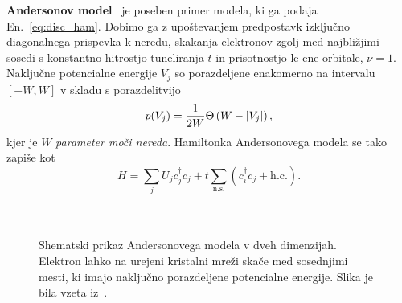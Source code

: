 \documentclass[10pt,a4paper]{article}
\begin{document}
\begin{minipage}[t]{0.54\textwidth}
\noindent
\textbf{Andersonov model}~\cite{anderson1958absence} je poseben primer modela, ki ga podaja En.~\eqref{eq:disc_ham}. Dobimo ga z upoštevanjem predpostavk izključno diagonalnega prispevka k neredu, skakanja elektronov zgolj med najbližjimi sosedi s konstantno hitrostjo tuneliranja $t$ in prisotnostjo le ene orbitale, $\nu=1$. Naključne potencialne energije $V_j$ so porazdeljene enakomerno na intervalu $\left[-W,W\right]$ v skladu s porazdelitvijo
\begin{equation}\label{eq:and_prob}
p(V_j)= \frac{1}{2W}\Theta \left(W - \left| V_j \right| \right),
\end{equation}
kjer je $W$ \emph{parameter moči nereda}. Hamiltonka Andersonovega modela se tako zapiše kot 
\begin{equation}\label{eq:Anderson_ham}
H=\sum\limits_j U_j c^\dagger_jc_j + t\sum\limits_{\mathrm{n. s.}}\left(c^\dagger_i c_j + \mathrm{h.c.}\right).
\end{equation}\\\\

\end{minipage}\hfill
\begin{minipage}[t]{0.43\textwidth}
\begin{figure}[H]
\caption{Shematski prikaz Andersonovega modela v dveh dimenzijah. Elektron lahko na urejeni kristalni mreži skače med sosednjimi mesti, ki imajo naključno porazdeljene potencialne energije. Slika je bila vzeta iz~\cite{lagendijk2009fifty}.  }
\label{fig:hopping_picture} 
\end{figure}
\end{minipage}\\\\
\end{document}
